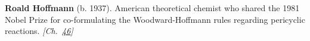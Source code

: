 \nobelchemistry \textbf{Roald Hoffmann} (b. 1937). American theoretical chemist who shared the 1981 Nobel Prize for co-formulating the Woodward-Hoffmann rules regarding pericyclic reactions. \emph{[Ch.~\hyperref[ch:woodwardhoffmannrules]{46}]}

